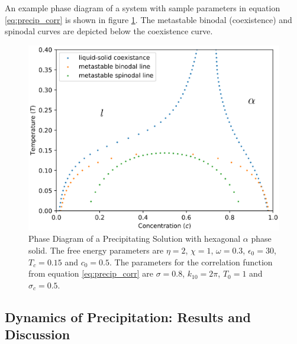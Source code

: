\documentclass[showkeys, prb, reprint]{revtex4-1}
\begin{document}
An example phase diagram of a system with sample parameters in equation
\ref{eq:precip_corr} is shown in figure \ref{fig:precip_phase_dia}. The
metastable binodal (coexistence) and spinodal curves are depicted below the
coexistence curve.

\begin{figure}
    \centering	
    \includegraphics[scale=0.5]{solution.eps}
    \caption[Coexistance Phase Diagram with Metastable Spinodal]{
        \label{fig:precip_phase_dia} Phase Diagram of a Precipitating Solution
        with hexagonal $\alpha$ phase solid. The free energy parameters are
        $\eta = 2$, $\chi = 1$, $\omega=0.3$, $\epsilon_0=30$, $T_c = 0.15$ and
        $c_0 = 0.5$. The parameters for the correlation function from equation
        \ref{eq:precip_corr} are $\sigma = 0.8$, $k_{10} = 2\pi$, $T_0 = 1$ and
        $\sigma_c = 0.5$.
    }
\end{figure}

\subsection{Dynamics of Precipitation: Results and Discussion} %

 
\end{document}
